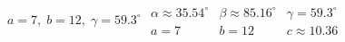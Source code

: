 { $a = 7, \; b = 12, \; \gamma = 59.3^{\circ}$ \label{firstlawofcosines}}
{ $\begin{array}{lll}\alpha \approx 35.54^{\circ} & \beta \approx 85.16^{\circ} & \gamma = 59.3^{\circ} \\a = 7 & b = 12 & c \approx 10.36 \end{array}$}
